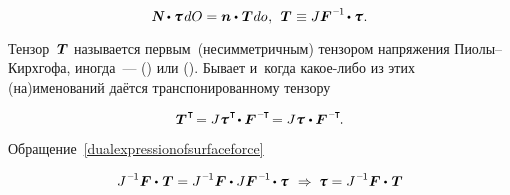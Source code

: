\begin{otherlanguage}{russian}
\nopagebreak\vspace{-0.16em}\begin{equation}\label{dualexpressionofsurfaceforce}
\mathboldN \dotp \cauchystress \hspace{.25ex} dO
= \bm{n} \dotp \hspace{.12ex} \firstpiolakirchhoffstress \hspace{.1ex} do
\hspace{.1ex}, \:\:
\firstpiolakirchhoffstress \hspace{.1ex} \equiv J \bm{F}^{\hspace{.1ex}\expminusone} \hspace{-0.2ex} \dotp \cauchystress \hspace{.1ex}.
\end{equation}

\vspace{-0.2em} Тензор~${\hspace{.1ex}\bm{T}}$ называется первым~(несимметричным) тензором напряжения Пиолы--Кирхгофа, иногда~---  () или  (). Бывает и~когда какое\hbox{-}либо из этих (на)именований даётся транспонированному тензору

\nopagebreak\vspace{-0.1em}\begin{equation*}
\firstpiolakirchhoffstress^{\hspace{.1ex}\T} \hspace{-0.32ex}
= J \cauchystress^{\hspace{.16ex}\T} \hspace{-0.32ex} \dotp \bm{F}^{\hspace{.1ex}\expminusT} \hspace{-0.32ex}
= J \cauchystress \hspace{.16ex} \dotp \bm{F}^{\hspace{.1ex}\expminusT} \hspace{-0.25ex}.
\end{equation*}

Обращение~\eqref{dualexpressionofsurfaceforce}

\begin{equation*}
J^{\hspace{.12ex}\expminusone} \bm{F} \dotp \hspace{.16ex} \firstpiolakirchhoffstress = J^{\hspace{.12ex}\expminusone} \bm{F} \dotp J \bm{F}^{\hspace{.16ex}\expminusone} \hspace{-0.2ex} \dotp \cauchystress
\:\,\Rightarrow\:
\cauchystress = J^{\hspace{.12ex}\expminusone} \bm{F} \dotp \hspace{.16ex} \firstpiolakirchhoffstress
\end{equation*}


\end{otherlanguage}
